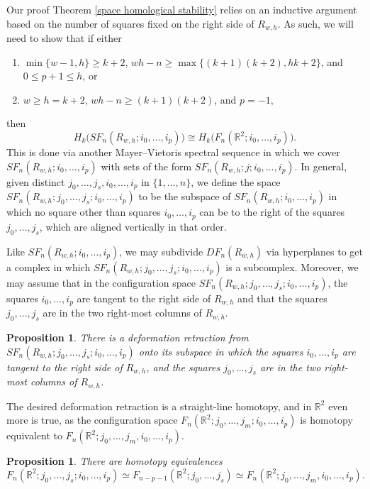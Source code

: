 \documentclass[pagebackref,colorlinks,citecolor=blue,linkcolor=blue,urlcolor=blue,filecolor=blue]{article}
\newtheorem{prop}[thm]{Proposition}
\theoremstyle{definition}\newtheorem{definition}[thm]{Definition}
\theoremstyle{definition}
\newcommand{\R}{\ensuremath{\mathbb{R}}}
\begin{document}
Our proof Theorem \ref{space homological stability} relies on an inductive argument based on the number of squares fixed on the right side of $R_{w,h}$.
As such, we will need to show that if either 
\begin{enumerate}
    \item $\min\{w-1,h\}\ge k+2$, $wh-n\ge \max\big\{(k+1)(k+2),hk+2\big\}$, and $0\le p+1\le h$, or
    \item $w\ge h=k+2$, $wh-n\ge (k+1)(k+2)$, and $p=-1$,
\end{enumerate}
then
\[
H_{k}\big(SF_{n}(R_{w, h};i_{0}, \dots, i_{p})\big)\cong H_{k}\big(F_{n}(\R^{2};i_{0}, \dots, i_{p})\big).
\]
This is done via another Mayer--Vietoris spectral sequence in which we cover $SF_{n}(R_{w, h};i_{0}, \dots, i_{p})$ with sets of the form $SF_{n}(R_{w,h};j;i_{0}, \dots, i_{p})$.
In general, given distinct $j_{0}, \dots, j_{s},i_{0}, \dots, i_{p}$ in $\{1, \dots, n\}$, we define the space $SF_{n}(R_{w,h};j_{0}, \dots, j_{s};i_{0}, \dots, i_{p})$ to be the subspace of $SF_{n}(R_{w,h};i_{0}, \dots, i_{p})$ in which no square other than squares $i_{0}, \dots, i_{p}$ can be to the right of the squares $j_{0}, \dots, j_{s}$, which are aligned vertically in that order.

Like $SF_{n}(R_{w,h};i_{0}, \dots, i_{p})$, we may subdivide $DF_{n}(R_{w,h})$ via hyperplanes to get a complex in which $SF_{n}(R_{w,h};j_{0}, \dots, j_{s};i_{0}, \dots, i_{p})$ is a subcomplex.
Moreover, we may assume that in the configuration space $SF_{n}(R_{w,h};j_{0}, \dots, j_{s};i_{0}, \dots, i_{p})$, the squares $i_{0}, \dots, i_{p}$ are tangent to the right side of $R_{w, h}$ and that the squares $j_{0}, \dots, j_{s}$ are in the two right-most columns of $R_{w,h}$.

\begin{prop}\label{squares in the two rightmost columns}
There is a deformation retraction from $SF_{n}(R_{w,h};j_{0}, \dots, j_{s};i_{0}, \dots, i_{p})$ onto its subspace in which the squares $i_{0}, \dots, i_{p}$ are tangent to the right side of $R_{w,h}$, and the squares $j_{0}, \dots, j_{s}$ are in the two right-most columns of $R_{w,h}$.
\end{prop}

The desired deformation retraction is a straight-line homotopy, and in $\R^{2}$ even more is true, as the configuration space $F_{n}(\R^{2};j_{0}, \dots, j_{m};i_{0}, \dots, i_{p})$ is homotopy equivalent to $F_{n}(\R^{2};j_{0}, \dots, j_{m},i_{0}, \dots, i_{p})$.

\begin{prop}\label{in points can move two columns left}
There are homotopy equivalences
\[
F_{n}(\R^{2};j_{0}, \dots, j_{s};i_{0}, \dots, i_{p})\simeq F_{n-p-1}(\R^{2};j_{0}, \dots, j_{s})\simeq F_{n}(\R^{2};j_{0}, \dots, j_{m},i_{0}, \dots, i_{p}).
\]
\end{prop}
\end{document}
